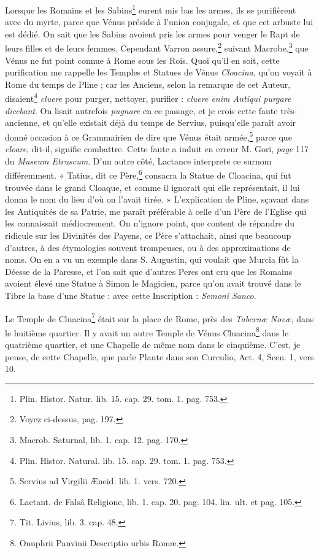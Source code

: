 \documentclass[a4paper, 18pt, oneside]{article}
\begin{document}
Lorsque les Romains et les Sabins\footnote{Plin. Histor. Natur. lib. 15. cap. 29. tom. 1. pag. 753.} eurent mis bas les armes, ils se purifièrent avec du myrte, parce que Vénus préside à l'union conjugale, et que cet arbuste lui est dédié. On sait que les Sabins avoient pris les armes pour venger le Rapt de leurs filles et de leurs femmes. Cependant Varron assure,\footnote{Voyez ci-dessus, pag. 197.} suivant Macrobe,\footnote{Macrob. Saturnal, lib. 1. cap. 12. pag. 170.} que Vénus ne fut point connue à Rome sous les Rois. Quoi qu'il en soit, cette purification me rappelle les Temples et Statues de Vénus \emph{Cloacina}, qu'on voyait à Rome du temps de Pline ; car les Anciens, selon la remarque de cet Auteur, disaient\footnote{Plin. Histor. Natural. lib. 15. cap. 29. tom. 1. pag. 753.} \emph{cluere} pour purger, nettoyer, purifier : \emph{cluere enim Antiqui purgare dicebant}. On lisait autrefois \emph{pugnare} en ce passage, et je crois cette faute très-ancienne, et qu'elle existait déjà du temps de Servius, puisqu'elle paraît avoir donné occasion à ce Grammairien de dire que Vénus était armée,\footnote{Servius ad Virgilii Æneid. lib. 1. vers. 720.} parce que \emph{cloare}, dit-il, signifie combattre. Cette faute a induit en erreur M. Gori, \emph{page} 117 du \emph{Museum Etruscum}. D'un autre côté, Lactance interprete ce surnom différemment. « Tatius, dit ce Père,\footnote{Lactant. de Falsâ Religione, lib. 1. cap. 20. pag. 104. lin. ult. et pag. 105.} consacra la Statue de Cloacina, qui fut trouvée dans le grand Cloaque, et comme il ignorait qui elle représentait, il lui donna le nom du lieu d'où on l'avait tirée. » L'explication de Pline, sçavant dans les Antiquités de sa Patrie, me paraît préférable à celle d'un Père de l'Eglise qui les connaissait médiocrement. On n'ignore point, que content de répandre du ridicule sur les Divinités des Payens, ce Père s'attachait, ainsi que beaucoup d'autres, à des étymologies souvent trompeuses, ou à des approximations de noms. On en a vu un exemple dans S. Augustin, qui voulait que Murcia fût la Déesse de la Paresse, et l'on sait que d'autres Peres ont cru que les Romains avoient élevé une Statue à Simon le Magicien, parce qu'on avait trouvé dans le Tibre la base d'une Statue : avec cette Inscription : \emph{Semoni Sanco}.

Le Temple de Cluacina\footnote{Tit. Livius, lib. 3. cap. 48.} était sur la place de Rome, près des \emph{Tabernæ Novæ}, dans le huitième quartier. Il y avait un autre Temple de Vénus Cluacina\footnote{Onuphrii Panvinii Descriptio urbis Romæ.} dans le quatrième quartier, et une Chapelle de même nom dans le cinquième. C'est, je pense, de cette Chapelle, que parle Plaute dans son Curculio, Act. 4, Scen. 1, vers 10.
\end{document}
